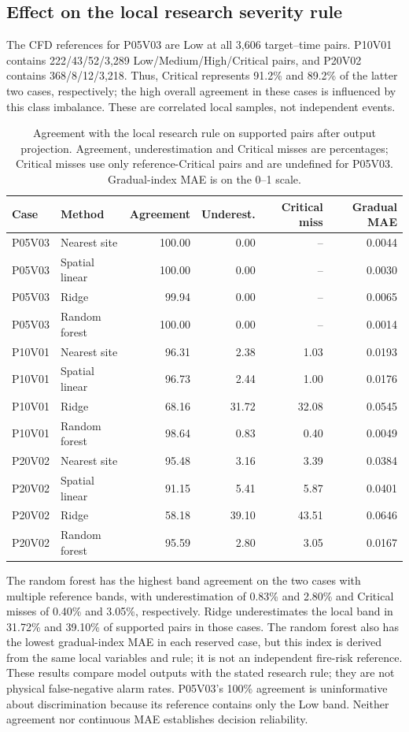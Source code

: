 \documentclass[preprint,12pt,authoryear]{elsarticle}
\begin{document}
\subsection{Effect on the local research severity rule}
The CFD references for P05V03 are Low at all 3,606 target--time pairs.
P10V01 contains 222/43/52/3,289 Low/Medium/High/Critical pairs, and P20V02
contains 368/8/12/3,218. Thus, Critical represents 91.2\% and 89.2\% of
the latter two cases, respectively; the high overall agreement in these
cases is influenced by this class imbalance. These are correlated local
samples, not independent events.

\begin{table}[htbp]\centering\small
\caption{Agreement with the local research rule on supported pairs after
output projection. Agreement, underestimation and Critical misses are
percentages; Critical misses use only reference-Critical pairs and are
undefined for P05V03. Gradual-index MAE is on the 0--1 scale.}
\label{tab:severity}
\begin{tabular}{@{}llrrrr@{}}\toprule
Case & Method & Agreement & Underest. & Critical miss & Gradual MAE\\\midrule
P05V03 & Nearest site & 100.00 & 0.00 & -- & 0.0044\\
P05V03 & Spatial linear & 100.00 & 0.00 & -- & 0.0030\\
P05V03 & Ridge & 99.94 & 0.00 & -- & 0.0065\\
P05V03 & Random forest & 100.00 & 0.00 & -- & 0.0014\\
P10V01 & Nearest site & 96.31 & 2.38 & 1.03 & 0.0193\\
P10V01 & Spatial linear & 96.73 & 2.44 & 1.00 & 0.0176\\
P10V01 & Ridge & 68.16 & 31.72 & 32.08 & 0.0545\\
P10V01 & Random forest & 98.64 & 0.83 & 0.40 & 0.0049\\
P20V02 & Nearest site & 95.48 & 3.16 & 3.39 & 0.0384\\
P20V02 & Spatial linear & 91.15 & 5.41 & 5.87 & 0.0401\\
P20V02 & Ridge & 58.18 & 39.10 & 43.51 & 0.0646\\
P20V02 & Random forest & 95.59 & 2.80 & 3.05 & 0.0167\\
\bottomrule
\end{tabular}
\end{table}

The random forest has the highest band agreement on the two cases with
multiple reference bands, with underestimation of 0.83\% and 2.80\% and
Critical misses of 0.40\% and 3.05\%, respectively. Ridge underestimates
the local band in 31.72\% and 39.10\% of supported pairs in those cases.
The random forest also has the lowest gradual-index MAE in each reserved
case, but this index is derived from the same local variables and rule;
it is not an independent fire-risk reference.
These results compare model outputs with the stated research rule; they
are not physical false-negative alarm rates. P05V03's 100\% agreement is
uninformative about discrimination because its reference contains only
the Low band. Neither agreement nor continuous MAE establishes decision
reliability.
\end{document}
